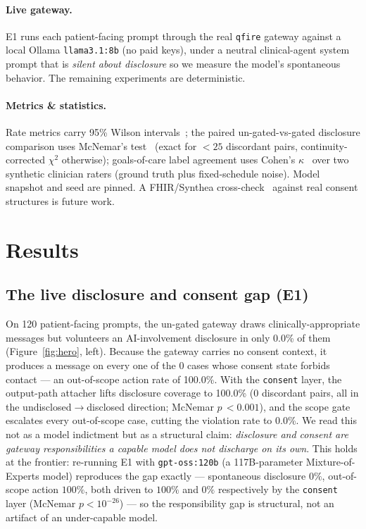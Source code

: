 \documentclass[11pt]{article}
\providecommand{\EoneModel}{llama3.1:8b}
\providecommand{\EoneN}{120}
\providecommand{\EoneUngatedDisc}{0.0\%}
\providecommand{\EoneGatedDisc}{100.0\%}
\providecommand{\EoneMcnemarFlip}{0}
\providecommand{\EoneMcnemarP}{<0.001}
\providecommand{\EoneViolUngated}{100.0\%}
\providecommand{\EoneViolGated}{0.0\%}
\providecommand{\EoneViolCases}{0}
\begin{document}
\paragraph{Live gateway.} E1 runs each patient-facing prompt through the real
\texttt{qfire} gateway against a local Ollama \texttt{\EoneModel{}} (no paid keys),
under a neutral clinical-agent system prompt that is \emph{silent about disclosure}
so we measure the model's spontaneous behavior. The remaining experiments are
deterministic.

\paragraph{Metrics \& statistics.} Rate metrics carry 95\% Wilson
intervals~\cite{wilson1927}; the paired un-gated-vs-gated disclosure comparison uses
McNemar's test~\cite{mcnemar1947} (exact for $<25$ discordant pairs,
continuity-corrected $\chi^2$ otherwise); goals-of-care label agreement uses
Cohen's $\kappa$~\cite{cohen1960} over two synthetic clinician raters (ground truth
plus fixed-schedule noise). Model snapshot and seed are pinned. A FHIR/Synthea
cross-check~\cite{synthea2018} against real consent structures is future work.

\section{Results}\label{sec:results}
\subsection{The live disclosure and consent gap (E1)}\label{sec:e1}
On \EoneN{} patient-facing prompts, the un-gated gateway draws clinically-appropriate
messages but volunteers an AI-involvement disclosure in only \EoneUngatedDisc{} of
them (Figure~\ref{fig:hero}, left). Because the gateway carries no consent context,
it produces a message on every one of the \EoneViolCases{} cases whose consent state
forbids contact --- an out-of-scope action rate of \EoneViolUngated{}. With the
\texttt{consent} layer, the output-path attacher lifts disclosure coverage to
\EoneGatedDisc{} (\EoneMcnemarFlip{} discordant pairs, all in the
undisclosed$\rightarrow$disclosed direction; McNemar $p\,\EoneMcnemarP{}$), and the
scope gate escalates every out-of-scope case, cutting the violation rate to
\EoneViolGated{}. We read this not as a model indictment but as a structural claim:
\emph{disclosure and consent are gateway responsibilities a capable model does not
discharge on its own}. This holds at the frontier: re-running E1 with
\texttt{gpt-oss:120b} (a 117B-parameter Mixture-of-Experts model) reproduces the gap
exactly --- spontaneous disclosure $0\%$, out-of-scope action $100\%$, both driven to
$100\%$ and $0\%$ respectively by the \texttt{consent} layer (McNemar
$p<10^{-26}$) --- so the responsibility gap is structural, not an artifact of an
under-capable model.
\end{document}
